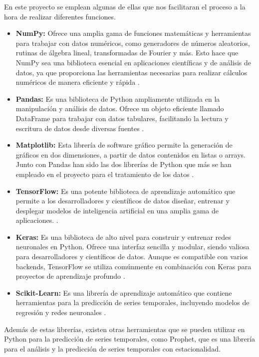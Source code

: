 \vspace{1\baselineskip}
En este proyecto se emplean algunas de ellas que nos facilitaran el proceso a la hora de realizar diferentes
funciones.

\begin{itemize}
  \item \textbf{NumPy:} Ofrece una amplia gama de funciones matemáticas y herramientas para trabajar con datos numéricos, como generadores de números aleatorios, rutinas de álgebra lineal, transformadas de Fourier y más. Esto hace que NumPy sea una biblioteca esencial en aplicaciones científicas y de análisis de datos, ya que proporciona las herramientas necesarias para realizar cálculos numéricos de manera eficiente y rápida \cite{numpy-website}. 
  \item \textbf{Pandas:} Es una biblioteca de Python ampliamente utilizada en la manipulación y análisis de datos. Ofrece un objeto eficiente llamado DataFrame para trabajar con datos tabulares, facilitando la lectura y escritura de datos desde diversas fuentes \cite{pandas-website}. 
  \item \textbf{Matplotlib:} Esta librería de software gráfico permite la generación de gráficos en dos dimensiones, a partir de datos contenidos en listas o arrays. Junto con Pandas han sido las dos librerías de Python que más se han empleado en el proyecto para el tratamiento de los datos \cite{MatplotlibWebsite}.
  \item \textbf{TensorFlow:} Es una potente biblioteca de aprendizaje automático que permite a los desarrolladores y científicos de datos diseñar, entrenar y desplegar modelos de inteligencia artificial en una amplia gama de aplicaciones. \cite{tensorflow-website}.
  \item  \textbf{Keras:} Es una biblioteca de alto nivel para construir y entrenar redes neuronales en Python. Ofrece una interfaz sencilla y modular, siendo valiosa para desarrolladores y científicos de datos. Aunque es compatible con varios backends, TensorFlow se utiliza comúnmente en combinación con Keras para proyectos de aprendizaje profundo \cite{keras-doc}.
  \item \textbf{Scikit-Learn:} Es una librería de aprendizaje automático que contiene herramientas para la predicción de series temporales, incluyendo modelos de regresión y redes neuronales \cite{sepulveda2023analisis}.
\end{itemize}

Además de estas librerías, existen otras herramientas que se pueden utilizar en Python para la predicción de series temporales, como Prophet, que es una librería para el análisis y la predicción de series temporales con estacionalidad.

